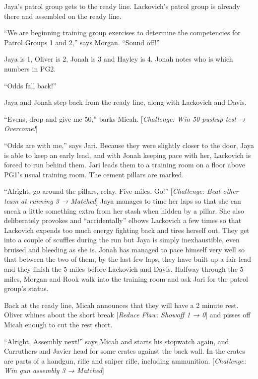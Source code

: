 Jaya's patrol group gets to the ready line.  Lackovich's patrol group is already there and assembled on the ready line. 



``We are beginning training group exercises to determine the competencies for Patrol Groups 1 and 2,'' says Morgan. ``Sound off!''

Jaya is 1, Oliver is 2, Jonah is 3 and Hayley is 4.  Jonah notes who is which numbers in PG2.

``Odds fall back!''

Jaya and Jonah step back from the ready line, along with Lackovich and Davis.

``Evens, drop and give me 50,'' barks Micah.  {[}\textit{Challenge: Win 50 pushup test → Overcome!}{]}



``Odds are with me,'' says Jari.  Because they were slightly closer to the door, Jaya is able to keep an early lead, and with Jonah keeping pace with her, Lackovich is forced to run behind them.  Jari leads them to a training room on a floor above PG1's usual training room.  The cement pillars are marked.  



``Alright, go around the pillars, relay.  Five miles.  Go!''  {[}\textit{Challenge: Beat other team at running 3 → Matched}{]}  Jaya manages to time her laps so that she can sneak a little something extra from her stash when hidden by a pillar.  She also deliberately provokes and ``accidentally'' elbows Lackovich a few times so that Lackovich expends too much energy fighting back and tires herself out.   They get into a couple of scuffles during the run but Jaya is simply inexhaustible, even bruised and bleeding as she is.  Jonah has managed to pace himself very well so that between the two of them, by the last few laps, they have built up a fair lead and they finish the 5 miles before Lackovich and Davis.  Halfway through the 5 miles, Morgan and Rook walk into the training room and ask Jari for the patrol group's status.



Back at the ready line, Micah announces that they will have a 2 minute rest.  Oliver whines about the short break {[}\textit{Reduce Flaw: Showoff 1 → 0}{]} and pisses off Micah enough to cut the rest short.



``Alright, Assembly next!'' says Micah and starts his stopwatch again, and Carruthers and Javier head for some crates against the back wall.  In the crates are parts of a handgun, rifle and sniper rifle, including ammunition.  {[}\textit{Challenge: Win gun assembly 3 → Matched}{]}




